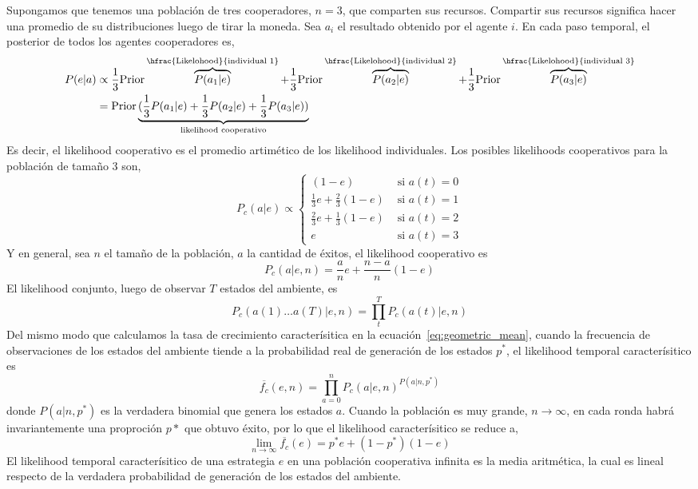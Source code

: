 \documentclass[a4paper,10pt]{article}
\begin{document}
Supongamos que tenemos una población de tres cooperadores, $n=3$, que comparten sus recursos.
Compartir sus recursos significa hacer una promedio de su distribuciones luego de tirar la moneda.
Sea $a_i$ el resultado obtenido por el agente $i$.
En cada paso temporal, el posterior de todos los agentes cooperadores es,
\begin{equation}
\begin{split}
P(e|a) &\propto \frac{1}{3} \text{Prior}  \overbrace{P(a_1|e)}^{\hfrac{\text{Likelohood}}{\text{individual 1}}} + \frac{1}{3} \text{Prior}  \overbrace{P(a_2|e)}^{\hfrac{\text{Likelohood}}{\text{individual 2}}}  + \frac{1}{3} \text{Prior}  \overbrace{P(a_3|e)}^{\hfrac{\text{Likelohood}}{\text{individual 3}}}  \\
&= \text{Prior} \underbrace{(\frac{1}{3} P(a_1|e) + \frac{1}{3} P(a_2|e) + \frac{1}{3} P(a_3|e))}_{\text{likelihood cooperativo}}
\end{split}
\end{equation}
%
Es decir, el likelihood cooperativo es el promedio artimético de los likelihood individuales.
Los posibles likelihoods cooperativos para la población de tamaño 3 son,
%
\begin{equation}
P_c(a|e) \propto 
\begin{cases}
(1-e) & \text{ si } a(t) = 0 \\
\frac{1}{3} e + \frac{2}{3} (1-e)  & \text{ si } a(t) = 1 \\
\frac{2}{3} e + \frac{1}{3} (1-e)    & \text{ si } a(t) = 2 \\
e & \text{ si } a(t) = 3
\end{cases}
\end{equation}
%
Y en general, sea $n$ el tamaño de la población, $a$ la cantidad de éxitos, el likelihood cooperativo es
\begin{equation}
P_c(a|e,n) = \frac{a}{n} e + \frac{n-a}{n}(1-e)
\end{equation}
%
El likelihood conjunto, luego de observar $T$ estados del ambiente, es
%
\begin{equation}
P_c(a(1)\dots a(T)|e,n) = \prod^T_t P_c(a(t)|e,n)
\end{equation}
%
Del mismo modo que calculamos la tasa de crecimiento caracterísitica en la ecuación~\ref{eq:geometric_mean}, cuando la frecuencia de observaciones de los estados del ambiente tiende a la probabilidad real de generación de los estados $p^*$, el likelihood temporal caracterísitico es
%
\begin{equation}
\overline{f_c}(e,n) = \prod_{a=0}^n P_c(a|e,n)^{P(a|n,p^*)}
\end{equation}
%
donde $P(a|n,p^*)$ es la verdadera binomial que genera los estados $a$.
Cuando la población es muy grande, $n\rightarrow \infty$, en cada ronda habrá invariantemente una proproción $p*$ que obtuvo éxito, por lo que el likelihood caracterísitico se reduce a,
%
\begin{equation}
\lim_{n\rightarrow \infty} \overline{f_c}(e) = p^* e + (1-p^*)(1-e)
\end{equation}
%
El likelihood temporal caracterísitico de una estrategia $e$ en una población cooperativa infinita es la media aritmética, la cual es lineal respecto de la verdadera probabilidad de generación de los estados del ambiente.
\end{document}
